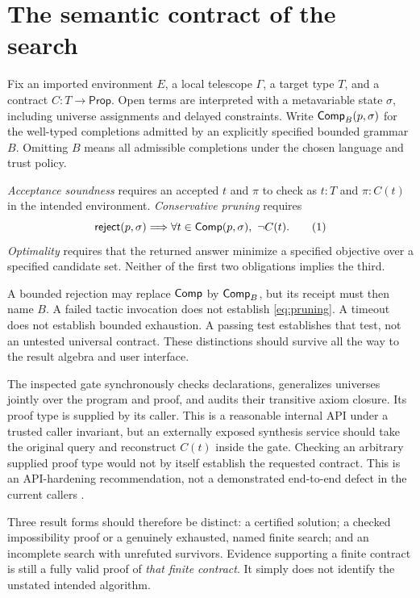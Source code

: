 \section{The semantic contract of the search}\label{sec:semantic}

Fix an imported environment $E$, a local telescope $\Gamma$, a target type
$T$, and a contract $C:T\to\mathsf{Prop}$. Open terms are interpreted with a
metavariable state $\sigma$, including universe assignments and delayed
constraints. Write $\mathsf{Comp}_B(p,\sigma)$ for the well-typed completions admitted
by an explicitly specified bounded grammar $B$. Omitting $B$ means all
admissible completions under the chosen language and trust policy.

\begin{definition}
\emph{Acceptance soundness} requires an accepted $t$ and $\pi$ to check as
$t:T$ and $\pi:C(t)$ in the intended environment. \emph{Conservative pruning}
requires
\[
 \mathsf{reject}(p,\sigma)\Longrightarrow
 \forall t\in\mathsf{Comp}(p,\sigma),\ \neg C(t).
 \tag{1}\label{eq:pruning}
\]
\emph{Optimality} requires that the returned answer minimize a specified
objective over a specified candidate set. Neither of the first two
obligations implies the third.
\end{definition}

A bounded rejection may replace $\mathsf{Comp}$ by $\mathsf{Comp}_B$, but its receipt must then
name $B$. A failed tactic invocation does not establish \eqref{eq:pruning}.
A timeout does not establish bounded exhaustion. A passing test establishes
that test, not an untested universal contract. These distinctions should
survive all the way to the result algebra and user interface.

The inspected gate synchronously checks declarations, generalizes universes
jointly over the program and proof, and audits their transitive axiom closure.
Its proof type is supplied by its caller. This is a reasonable internal API
under a trusted caller invariant, but an externally exposed synthesis service
should take the original query and reconstruct $C(t)$ inside the gate. Checking
an arbitrary supplied proof type would not by itself establish the requested
contract. This is an API-hardening recommendation, not a demonstrated
end-to-end defect in the current callers \cite{gatecode}.

Three result forms should therefore be distinct: a certified solution;
a checked impossibility proof or a genuinely exhausted, named finite search;
and an incomplete search with unrefuted survivors. Evidence supporting a
finite contract is still a fully valid proof of \emph{that finite contract}.
It simply does not identify the unstated intended algorithm.
